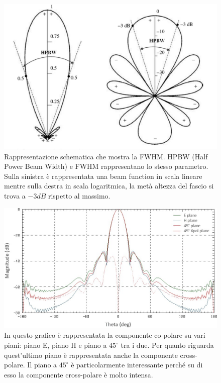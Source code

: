 \documentclass[12pt,a4paper,final]{book}
\begin{document}
\begin{figure}[!ht]
	\centering
	\includegraphics[width=0.8\linewidth]{../figures/fwhm.png}
	\caption{Rappresentazione schematica che mostra la FWHM. HPBW (Half Power Beam Width) e FWHM rappresentano lo stesso parametro. Sulla sinistra è rappresentata una beam function in scala lineare mentre sulla destra in scala logaritmica, la metà altezza del fascio si trova a $-3 \unit{dB}$ rispetto al massimo.}
	\label{fwhm}
\end{figure}

\begin{figure}[!ht]
	\centering
	\includegraphics[width=\linewidth]{../figures/plane_cut.png}
	\caption{In questo grafico è rappresentata la componente co-polare su vari piani: piano E, piano H e piano a $45^{\circ}$ tra i due. Per quanto riguarda quest'ultimo piano è rappresentata anche la componente cross-polare. Il piano a $45^{\circ}$ è particolarmente interessante perché su di esso la componente cross-polare è molto intensa.}
	\label{plane_cut}
\end{figure}

\end{document}
